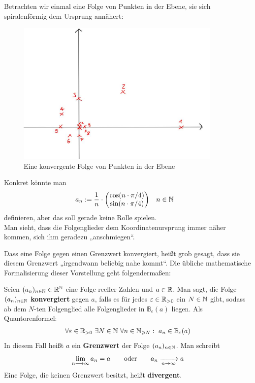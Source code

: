 \begin{bem}[Motivation]
 Betrachten wir einmal eine Folge von Punkten in der Ebene, sie sich spiralenförmig dem Ursprung annähert:
     \begin{figure}[H]
\begin{center}
\includegraphics[width=10cm]{./_img/Spirale.jpeg}
\end{center}
\centering \caption{Eine konvergente Folge von Punkten in der Ebene}
\end{figure}
Konkret könnte man
\begin{align*}
 a_n & := \frac{1}{n}\cdot \begin{pmatrix}
           \cos(n\cdot \pi/4) \\
           \sin(n\cdot \pi/4)
          \end{pmatrix} && n\in {\mathbb N}
\end{align*}
definieren, aber das soll gerade keine Rolle spielen. \\
Man sieht, dass die Folgenglieder dem Koordinatenursprung immer näher kommen, sich ihm geradezu „anschmiegen“.
\end{bem}



Dass eine Folge gegen einen Grenzwert konvergiert, heißt grob gesagt, dass sie diesem Grenzwert „irgendwann beliebig nahe kommt“. Die übliche mathematische Formalisierung dieser Vorstellung geht folgendermaßen:
\begin{de}[Konvergenz]
	Seien $(a_n)_{n\in {\mathbb N}}\in {\mathbb R}^{\mathbb N}$ eine Folge reeller Zahlen und $a\in {\mathbb R}$. Man sagt, die Folge $(a_n)_{n\in {\mathbb N}}$ \textbf{konvergiert} gegen $a$, falls es für jedes $\varepsilon \in {\mathbb R}_{>0}$ ein $N\in {\mathbb N}$ gibt, sodass ab dem $N$-ten Folgenglied alle Folgenglieder in $\mathbb{B}_\epsilon(a)$ liegen. Als Quantorenformel:
	\begin{align*}
	\forall\varepsilon\in {\mathbb R}_{>0}\ \exists N\in{\mathbb N}\ \forall n\in {\mathbb N}_{\geqslant N}:\ a_n\in \mathbb{B}_\varepsilon(a)
	\end{align*}
	In diesem Fall heißt $a$ ein \textbf{Grenzwert} der Folge $(a_n)_{n\in {\mathbb N}}$. Man schreibt
	\[ \lim\limits_{n\longrightarrow\infty}a_n=a \qquad\text{oder}\qquad a_n\xrightarrow[n\to \infty]{} a \]
	Eine Folge, die keinen Grenzwert besitzt, heißt \textbf{divergent}.
\end{de}



